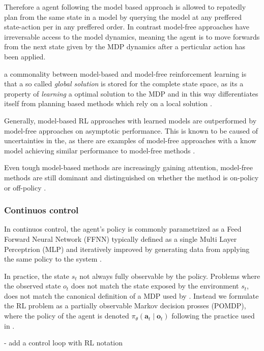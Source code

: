 Therefore a agent following the model based approach is allowed to repatedly plan from the same state in a model by querying the model at any preffered state-action per in any preffered order. In contrast model-free approaches have irreversable access to the model dynamics, meaning the agent is to move forwards from the next state given by the MDP dynamics after a perticular action has been applied.

a commonality between model-based and model-free reinforcement learning is that a so called \textit{global solution} is stored for the complete state space, as its a property of \textit{learning} a optimal solution to the MDP and in this way differentiates itself from planning based methods which rely on a {local solution} \parencite{moerland2023mbrl}. 

Generally, model-based RL approaches with learned models are outperformed by model-free approaches on asymptotic performance. This is known to be caused of uncertainties in the, as there are examples of model-free approaches with a know model achieving similar performance to model-free methods \parencite{moerland2023mbrl}. 

Even tough model-based methods are increasingly gaining attention, model-free methods are still dominant and distinguished on whether the method is on-policy or off-policy \textcite{sutton2018reinforcement}.

\subsubsection{Continuos control}
In continuos control, the agent's policy is commonly parametrized as a Feed Forward Neural Network (FFNN) typically defined as a single Multi Layer Perceptrion (MLP) and iteratively improved by generating data from applying the same policy to the system \parencite{moerland2023mbrl}.

In practice, the state $s_t$ not always fully observable by the policy. Problems where the observed state $o_t$ does not match the state exposed by the environment $s_t$, does not match the canonical definition of a MDP used by \cite{sutton2018reinforcement}. Instead we formulate the RL problem as a partially observable Markov decision prosses (POMDP), where the policy of the agent is denoted $\pi_\theta(\boldsymbol{a}_t \mid \boldsymbol{o}_t)$ following the practice used in \cite{song2023reaching}.

- add a control loop with RL notation

